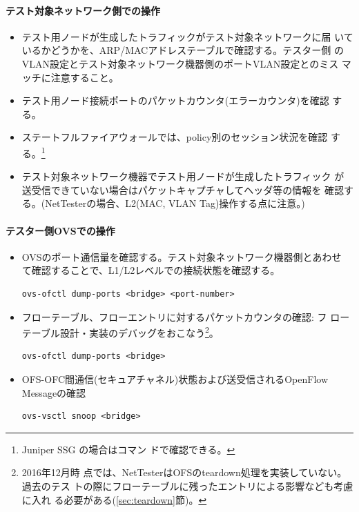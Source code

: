     \paragraph{テスト対象ネットワーク側での操作}

\begin{itemize}
 \item テスト用ノードが生成したトラフィックがテスト対象ネットワークに届
       いているかどうかを、ARP/MACアドレステーブルで確認する。テスター側
       のVLAN設定とテスト対象ネットワーク機器側のポートVLAN設定とのミス
       マッチに注意すること。
 \item テスト用ノード接続ポートのパケットカウンタ(エラーカウンタ)を確認
       する。
 \item ステートフルファイアウォールでは、policy別のセッション状況を確認
       する。\footnote{Juniper SSG の場合はコマン
       ドで確認できる。}
 \item テスト対象ネットワーク機器でテスト用ノードが生成したトラフィック
       が送受信できていない場合はパケットキャプチャしてヘッダ等の情報を
       確認する。(NetTesterの場合、L2(MAC, VLAN Tag)操作する点に注意。)
\end{itemize}

    \paragraph{テスター側OVSでの操作}

\begin{itemize}
 \item OVSのポート通信量を確認する。テスト対象ネットワーク機器側とあわせ
       て確認することで、L1/L2レベルでの接続状態を確認する。
\begin{lstlisting}
ovs-ofctl dump-ports <bridge> <port-number>
\end{lstlisting}
 \item フローテーブル、フローエントリに対するパケットカウンタの確認: フ
       ローテーブル設計・実装のデバッグをおこなう\footnote{2016年12月時
       点では、NetTesterはOFSのteardown処理を実装していない。過去のテス
       トの際にフローテーブルに残ったエントリによる影響なども考慮に入れ
       る必要がある(\ref{sec:teardown}節)。}。
\begin{lstlisting}
ovs-ofctl dump-ports <bridge>
\end{lstlisting}
 \item OFS-OFC間通信(セキュアチャネル)状態および送受信されるOpenFlow
       Messageの確認
\begin{lstlisting}
ovs-vsctl snoop <bridge>
\end{lstlisting}
\end{itemize}

